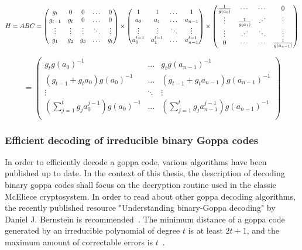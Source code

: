 \documentclass[11pt,
  oneside,openany,    %
]{scrreprt}
\begin{document}
\begin{equation*}
H = ABC = \begin{pmatrix}
 g_{t} & 0 & 0 &\dots & 0\\
 g_{t-1} & g_{t} & 0 & \dots & 0\\
 \vdots & \vdots & \vdots & \ddots & \vdots\\
 g_{1} & g_{2} & g_{3} & \dots & g_{t}\\
\end{pmatrix}
%
\times
%
\begin{pmatrix}
 1 & 1 & \dots & 1\\
 a_{0} & a_{1} & \dots & a_{n-1}\\
 \vdots & \vdots & \ddots & \vdots\\
 a_{0}^{t-1} & a_{1}^{t-1} & \dots & a_{n-1}^{t-1}\\
\end{pmatrix}
%
\times
%
\begin{pmatrix}
 \frac{1}{g(a_{0})} & \cdots & \cdots & 0\\
 \vdots & \frac{1}{g(a_{1})} & \reflectbox{$\ddots$} & \vdots\\
 \vdots & \reflectbox{$\ddots$} & \ddots & \vdots\\
 0 & \cdots & \cdots & \frac{1}{g(a_{n-1})}\\
\end{pmatrix}
\end{equation*}

\begin{equation*}
 = \begin{pmatrix}
 g_{t} g(a_{0})^{-1} & \dots & g_{t} g(a_{n-1})^{-1}\\
 (g_{t-1} + g_{t} a_{0})g(a_{0})^{-1} & \dots & (g_{t-1} + g_{t} a_{n-1})g(a_{n-1})^{-1}\\
 \vdots & \ddots & \vdots\\
 (\sum_{j=1}^{t} g_{j} a_{0}^{j-1})g(a_{0})^{-1} & \dots & (\sum_{j=1}^{t} g_{j} a_{n-1}^{j-1})g(a_{n-1})^{-1}\\
\end{pmatrix}
\end{equation*}

\subsubsection{Efficient decoding of irreducible binary Goppa codes}

In order to efficiently decode a goppa code, various algorithms have been published up to date. In the context of this thesis, the description of decoding binary goppa codes shall focus on the decryption routine used in the classic McEliece cryptosystem. In order to read about other goppa decoding algorithms, the recently published resource "Understanding binary-Goppa decoding" by Daniel J. Bernstein is recommended~\cite{understandingGoppaDecoding}. The minimum distance of a goppa code generated by an irreducible polynomial of degree $t$ is at least $2t + 1$, and the maximum amount of correctable errors is $t$~\cite{engelbertOverbeckSchmidt}.
\end{document}
